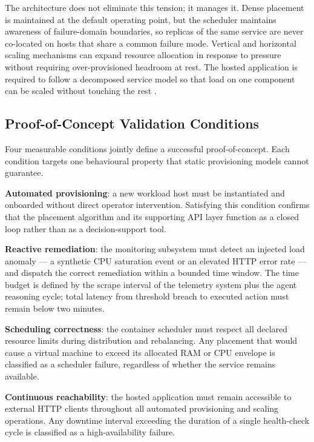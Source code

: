 \documentclass[12pt,a4paper]{report}
\begin{document}
The architecture does not eliminate this tension; it manages it. Dense placement is
maintained at the default operating point, but the scheduler maintains awareness of
failure-domain boundaries, so replicas of the same service are never co-located on
hosts that share a common failure mode. Vertical and horizontal scaling mechanisms
can expand resource allocation in response to pressure without requiring
over-provisioned headroom at rest. The hosted application is required to follow a
decomposed service model so that load on one component can be scaled without touching
the rest \cite{senjab2023survey}.

\subsection{Proof-of-Concept Validation Conditions}

Four measurable conditions jointly define a successful proof-of-concept. Each
condition targets one behavioural property that static provisioning models cannot
guarantee.

\textbf{Automated provisioning}: a new workload host must be instantiated and
onboarded without direct operator intervention. Satisfying this condition confirms
that the placement algorithm and its supporting API layer function as a closed loop
rather than as a decision-support tool.

\textbf{Reactive remediation}: the monitoring subsystem must detect an injected
load anomaly --- a synthetic CPU saturation event or an elevated HTTP error rate ---
and dispatch the correct remediation within a bounded time window. The time budget
is defined by the scrape interval of the telemetry system plus the agent reasoning
cycle; total latency from threshold breach to executed action must remain below
two minutes.

\textbf{Scheduling correctness}: the container scheduler must respect all declared
resource limits during distribution and rebalancing. Any placement that would cause
a virtual machine to exceed its allocated RAM or CPU envelope is classified as a
scheduler failure, regardless of whether the service remains available.

\textbf{Continuous reachability}: the hosted application must remain accessible to
external HTTP clients throughout all automated provisioning and scaling operations.
Any downtime interval exceeding the duration of a single health-check cycle is
classified as a high-availability failure.

\end{document}
